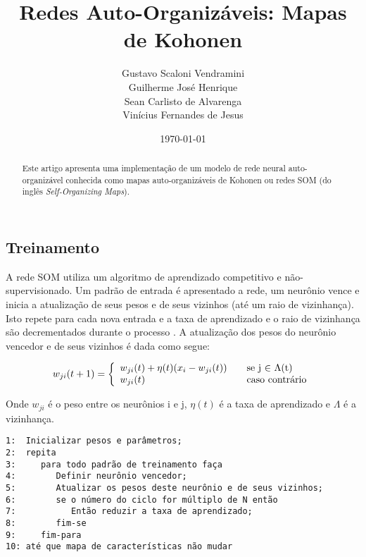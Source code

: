 \documentclass[a4paper]{article}
\title{Redes Auto-Organizáveis: Mapas de Kohonen}
\author{Gustavo Scaloni Vendramini    \\ 
        Guilherme José Henrique       \\
        Sean Carlisto de Alvarenga    \\
        Vinícius Fernandes de Jesus}
\date{\today}
\begin{document}
\maketitle

\begin{abstract}
Este artigo apresenta uma implementação de um modelo de rede neural auto-organizável conhecida como mapas auto-organizáveis de Kohonen ou redes SOM (do inglês \textit{Self-Organizing Maps}).
\end{abstract}



\subsection{Treinamento}\label{treinamento}
A rede SOM utiliza um algoritmo de aprendizado competitivo e não-supervisionado. Um padrão de entrada é apresentado a rede, um neurônio vence e inicia a atualização de seus pesos e de seus vizinhos (até um raio de vizinhança). Isto repete para cada nova entrada e a taxa de aprendizado e o raio de vizinhança são decrementados durante o processo \cite{Braga,Haykin}. A atualização dos pesos do neurônio vencedor e de seus vizinhos é dada como segue:

\[ w_{ji}(t+1) = \left\{ 
  \begin{array}{l l}
    w_{ji}(t) + \eta(t)(x_{i}- w_{ji}(t)) & \quad \text{se j $\in$ $\Lambda$(t)}\\
    w_{ji}(t) & \quad \text{caso contrário}
  \end{array} \right.\]

Onde $w_{ji}$ é o peso entre os neurônios i e j, $\eta(t)$ é a taxa de aprendizado e $\Lambda$ é a vizinhança.

\begin{verbatim}
1:  Inicializar pesos e parâmetros;
2:  repita
3:     para todo padrão de treinamento faça
4:        Definir neurônio vencedor;
5:        Atualizar os pesos deste neurônio e de seus vizinhos;
6:        se o número do ciclo for múltiplo de N então
7:           Então reduzir a taxa de aprendizado;
8:        fim-se
9:     fim-para
10: até que mapa de características não mudar
\end{verbatim}







\end{document}
